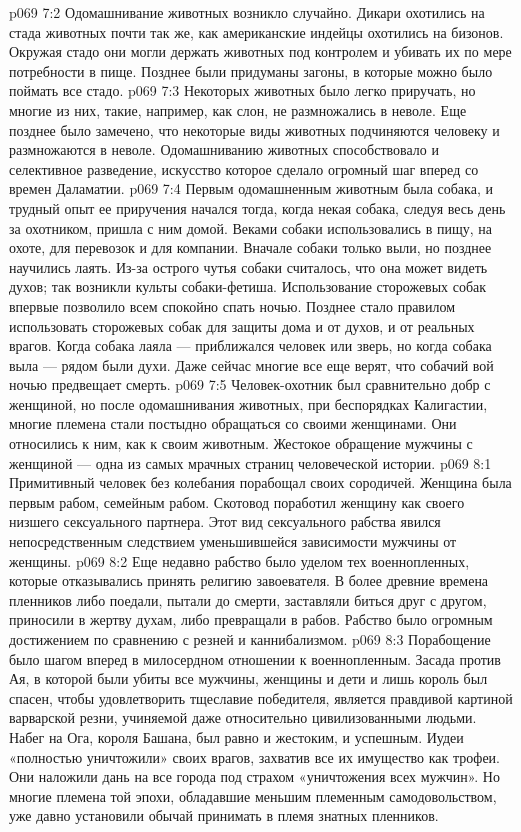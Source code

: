 \vs p069 7:2 Одомашнивание животных возникло случайно. Дикари охотились на стада животных почти так же, как американские индейцы охотились на бизонов. Окружая стадо они могли держать животных под контролем и убивать их по мере потребности в пище. Позднее были придуманы загоны, в которые можно было поймать все стадо.
\vs p069 7:3 Некоторых животных было легко приручать, но многие из них, такие, например, как слон, не размножались в неволе. Еще позднее было замечено, что некоторые виды животных подчиняются человеку и размножаются в неволе. Одомашниванию животных способствовало и селективное разведение, искусство которое сделало огромный шаг вперед со времен Даламатии.
\vs p069 7:4 Первым одомашненным животным была собака, и трудный опыт ее приручения начался тогда, когда некая собака, следуя весь день за охотником, пришла с ним домой. Веками собаки использовались в пищу, на охоте, для перевозок и для компании. Вначале собаки только выли, но позднее научились лаять. Из\hyp{}за острого чутья собаки считалось, что она может видеть духов; так возникли культы собаки\hyp{}фетиша. Использование сторожевых собак впервые позволило всем спокойно спать ночью. Позднее стало правилом использовать сторожевых собак для защиты дома и от духов, и от реальных врагов. Когда собака лаяла --- приближался человек или зверь, но когда собака выла --- рядом были духи. Даже сейчас многие все еще верят, что собачий вой ночью предвещает смерть.
\vs p069 7:5 Человек\hyp{}охотник был сравнительно добр с женщиной, но после одомашнивания животных, при беспорядках Калигастии, многие племена стали постыдно обращаться со своими женщинами. Они относились к ним, как к своим животным. Жестокое обращение мужчины с женщиной --- одна из самых мрачных страниц человеческой истории.
\vs p069 8:1 Примитивный человек без колебания порабощал своих сородичей. Женщина была первым рабом, семейным рабом. Скотовод поработил женщину как своего низшего сексуального партнера. Этот вид сексуального рабства явился непосредственным следствием уменьшившейся зависимости мужчины от женщины.
\vs p069 8:2 Еще недавно рабство было уделом тех военнопленных, которые отказывались принять религию завоевателя. В более древние времена пленников либо поедали, пытали до смерти, заставляли биться друг с другом, приносили в жертву духам, либо превращали в рабов. Рабство было огромным достижением по сравнению с резней и каннибализмом.
\vs p069 8:3 Порабощение было шагом вперед в милосердном отношении к военнопленным. Засада против Ая, в которой были убиты все мужчины, женщины и дети и лишь король был спасен, чтобы удовлетворить тщеславие победителя, является правдивой картиной варварской резни, учиняемой даже относительно цивилизованными людьми. Набег на Ога, короля Башана, был равно и жестоким, и успешным. Иудеи «полностью уничтожили» своих врагов, захватив все их имущество как трофеи. Они наложили дань на все города под страхом «уничтожения всех мужчин». Но многие племена той эпохи, обладавшие меньшим племенным самодовольством, уже давно установили обычай принимать в племя знатных пленников.
